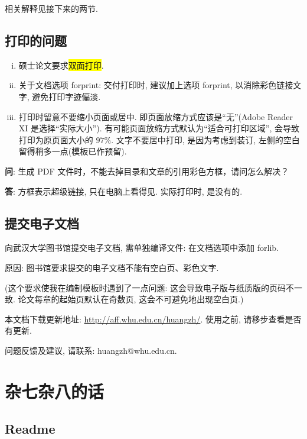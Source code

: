 \documentclass{WHUMaster}   %
\begin{document}
相关解释见接下来的两节.



\section{打印的问题}
\begin{enumerate}[i)]
  \item  硕士论文要求\colorbox{yellow}{双面打印}.
  \item  关于文档选项 forprint: 交付打印时, 建议加上选项 forprint, 以消除彩色链接文字, 避免打印字迹偏淡.
  \item  打印时留意不要缩小页面或居中. 即页面放缩方式应该是``无''(Adobe Reader XI 是选择``实际大小'').
           有可能页面放缩方式默认为``适合可打印区域'', 会导致打印为原页面大小的 $97\%$.
           文字不要居中打印, 是因为考虑到装订, 左侧的空白留得稍多一点(模板已作预留).
\end{enumerate}

\textbf{问}: {\kaishu 生成 PDF 文件时，不能去掉目录和文章的引用彩色方框，请问怎么解决？}

\textbf{答}: {\kaishu 方框表示超级链接, 只在电脑上看得见. 实际打印时, 是没有的.}





\section{提交电子文档}

向武汉大学图书馆提交电子文档, 需单独编译文件: 在文档选项中添加 forlib.

原因: 图书馆要求提交的电子文档不能有空白页、彩色文字.

({\kaishu 这个要求使我在编制模板时遇到了一点问题: 这会导致电子版与纸质版的页码不一致.  论文每章的起始页默认在奇数页, 这会不可避免地出现空白页.})


本文档下载更新地址: \url{http://aff.whu.edu.cn/huangzh/}. 使用之前, 请移步查看是否有更新.

问题反馈及建议, 请联系: huangzh@whu.edu.cn.




\chapter{杂七杂八的话}

\section{Readme}
\end{document}
